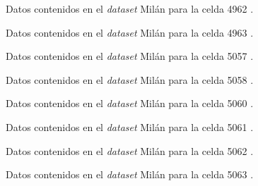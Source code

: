\begin{figure}[h!]
	\centering
	
	\caption{Datos contenidos en el \textit{dataset} Milán para la celda 4962 \cite{milandataset}.}
	\label{4962}
\end{figure}
\FloatBarrier


\begin{figure}[h!]
	\centering
	
	\caption{Datos contenidos en el \textit{dataset} Milán para la celda 4963 \cite{milandataset}.}
	\label{4963}
\end{figure}
\FloatBarrier

\begin{figure}[h!]
	\centering
	
	\caption{Datos contenidos en el \textit{dataset} Milán para la celda 5057 \cite{milandataset}.}
	\label{5057}
\end{figure}
\FloatBarrier


\begin{figure}[h!]
	\centering
	
	\caption{Datos contenidos en el \textit{dataset} Milán para la celda 5058 \cite{milandataset}.}
	\label{5058}
\end{figure}
\FloatBarrier

\begin{figure}[h!]
	\centering
	
	\caption{Datos contenidos en el \textit{dataset} Milán para la celda 5060 \cite{milandataset}.}
	\label{5060}
\end{figure}
\FloatBarrier

\begin{figure}[h!]
	\centering
	
	\caption{Datos contenidos en el \textit{dataset} Milán para la celda 5061 \cite{milandataset}.}
	\label{5061}
\end{figure}
\FloatBarrier

\begin{figure}[h!]
	\centering
	
	\caption{Datos contenidos en el \textit{dataset} Milán para la celda 5062 \cite{milandataset}.}
	\label{5062}
\end{figure}
\FloatBarrier

\begin{figure}[h!]
	\centering
	
	\caption{Datos contenidos en el \textit{dataset} Milán para la celda 5063 \cite{milandataset}.}
	\label{5063}
\end{figure}
\FloatBarrier

